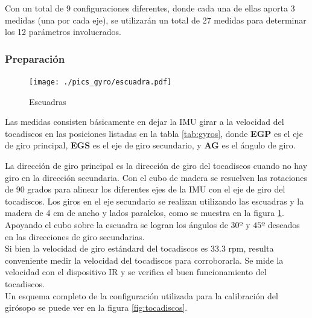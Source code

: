 \documentclass[main]{subfiles}
\begin{document}
Con un total de 9 configuraciones diferentes, donde cada una de ellas aporta 3 medidas (una por cada eje), se utilizarán un total de 27 medidas para determinar los 12 parámetros involucrados.

\vspace{-5pt}
\subsubsection*{Preparación}

\begin{figure}
  \vspace{-30pt}
  \begin{center}
    \texttt{[image: ./pics\_gyro/escuadra.pdf]}
  \end{center}
  \vspace{-20pt}
  \caption{Escuadras}
  \label{fig:escuadras}
\end{figure}

Las medidas consisten básicamente en dejar la IMU girar a la velocidad del tocadiscos en las posiciones listadas en la tabla \ref{tab:gyros}, donde \textbf{EGP} es el eje de giro principal, \textbf{EGS} es el eje de giro secundario, y \textbf{AG} es el ángulo de giro.

La dirección de giro principal es la dirección de giro del tocadiscos cuando no hay giro en la dirección secundaria. Con el cubo de madera se resuelven las rotaciones de 90 grados para alinear los diferentes ejes de la IMU con el eje de giro del tocadiscos. Los giros en el eje secundario se realizan utilizando las escuadras y la madera de 4 cm de ancho y lados paralelos, como se muestra en la figura \ref{fig:escuadras}. Apoyando el cubo sobre la escuadra se logran los ángulos de $30º$ y $45º$ deseados en las direcciones de giro secundarias.\\

Si bien la velocidad de giro estándard del tocadiscos es 33.3 rpm, resulta conveniente medir la velocidad del tocadiscos para corroborarla. Se mide la velocidad con el dispositivo IR y se verifica el buen funcionamiento del tocadiscos.\\

Un esquema completo de la configuración utilizada para la calibración del girósopo se puede ver en la figura \ref{fig:tocadiscos}.
\end{document}
